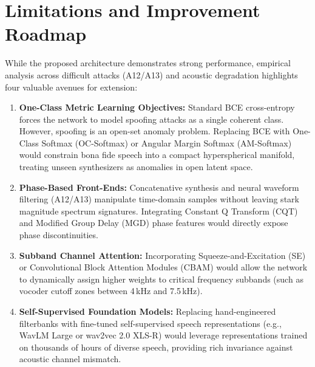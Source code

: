 \documentclass[runningheads]{llncs}
\begin{document}
\section{Limitations and Improvement Roadmap}
\label{sec:roadmap}
While the proposed architecture demonstrates strong performance, empirical analysis across difficult attacks (A12/A13) and acoustic degradation highlights four valuable avenues for extension:
\begin{enumerate}
    \item \textbf{One-Class Metric Learning Objectives:} Standard BCE cross-entropy forces the network to model spoofing attacks as a single coherent class. However, spoofing is an open-set anomaly problem. Replacing BCE with One-Class Softmax (OC-Softmax) or Angular Margin Softmax (AM-Softmax) would constrain bona fide speech into a compact hyperspherical manifold, treating unseen synthesizers as anomalies in open latent space.
    \item \textbf{Phase-Based Front-Ends:} Concatenative synthesis and neural waveform filtering (A12/A13) manipulate time-domain samples without leaving stark magnitude spectrum signatures. Integrating Constant Q Transform (CQT) and Modified Group Delay (MGD) phase features would directly expose phase discontinuities.
    \item \textbf{Subband Channel Attention:} Incorporating Squeeze-and-Excitation (SE) or Convolutional Block Attention Modules (CBAM) would allow the network to dynamically assign higher weights to critical frequency subbands (such as vocoder cutoff zones between 4\,kHz and 7.5\,kHz).
    \item \textbf{Self-Supervised Foundation Models:} Replacing hand-engineered filterbanks with fine-tuned self-supervised speech representations (e.g., WavLM Large or wav2vec 2.0 XLS-R) would leverage representations trained on thousands of hours of diverse speech, providing rich invariance against acoustic channel mismatch.
\end{enumerate}

\end{document}
